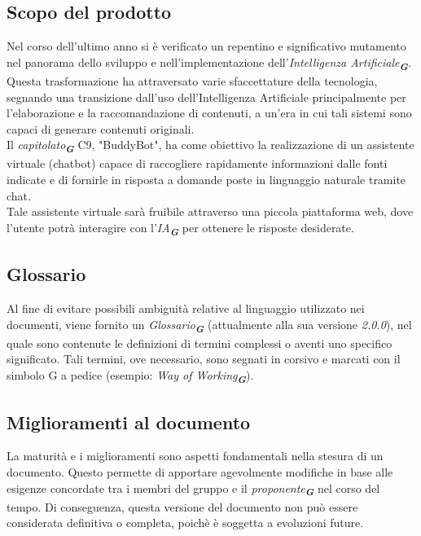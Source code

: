 \subsection{Scopo del prodotto}
Nel corso dell'ultimo anno si è verificato un repentino e significativo mutamento nel panorama
dello sviluppo e nell'implementazione dell'\emph{Intelligenza Artificiale}\textsubscript{\textit{\textbf{G}}}.
Questa trasformazione ha attraversato varie sfaccettature della tecnologia, segnando una transizione dall'uso
dell'Intelligenza Artificiale principalmente per l'elaborazione e la raccomandazione di contenuti, a un'era in
cui tali sistemi sono capaci di generare contenuti originali. \\
Il \emph{capitolato}\textsubscript{\textit{\textbf{G}}} C9, "BuddyBot", ha come obiettivo la realizzazione di un assistente virtuale (chatbot) 
capace di raccogliere rapidamente informazioni dalle fonti indicate e di fornirle in risposta a domande poste in 
linguaggio naturale tramite chat.\\
Tale assistente virtuale sarà fruibile attraverso una piccola piattaforma web, dove l'utente potrà interagire con l'\emph{IA}\textsubscript{\textit{\textbf{G}}} 
per ottenere le risposte desiderate.

\subsection{Glossario}
Al fine di evitare possibili ambiguità relative al linguaggio utilizzato nei documenti, viene fornito un \emph{Glossario}\textsubscript{\textit{\textbf{G}}}
(attualmente alla sua versione \emph{2.0.0}), nel quale sono contenute le definizioni di termini complessi o aventi uno 
specifico significato. Tali termini, ove necessario, sono segnati in corsivo e marcati con il simbolo G a pedice
(esempio: \emph{Way of Working}\textsubscript{\textit{\textbf{G}}}).

\subsection{Miglioramenti al documento}
La maturità e i miglioramenti sono aspetti fondamentali nella stesura di un documento.
Questo permette di apportare agevolmente modifiche in base alle esigenze concordate tra i
membri del gruppo e il \emph{proponente}\textsubscript{\textit{\textbf{G}}} nel corso del tempo. Di conseguenza, questa versione del
documento non può essere considerata definitiva o completa, poichè è soggetta a evoluzioni future.

